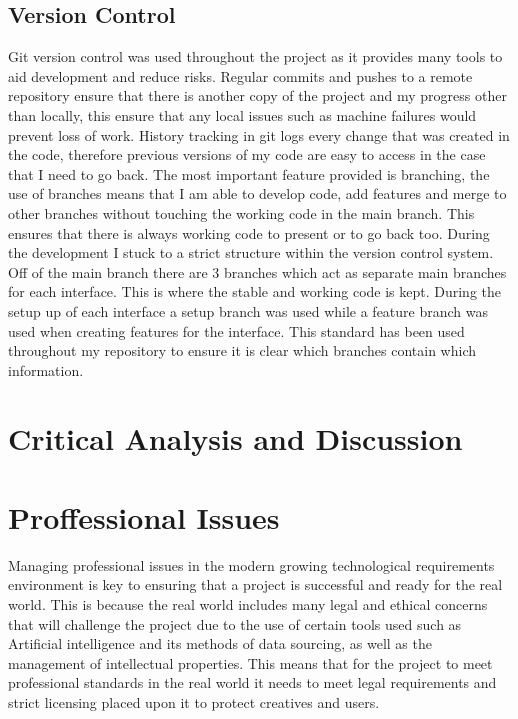 \documentclass[]{project_final}
\begin{document}
\section{Version Control}
Git version control was used throughout the project as it provides many tools to aid development and reduce risks. Regular commits and pushes to a remote repository ensure that
there is another copy of the project and my progress other than locally, this ensure that any
local issues such as machine failures would prevent loss of work.
History tracking in git logs every change that was created in the code, therefore previous
versions of my code are easy to access in the case that I need to go back.
The most important feature provided is branching, the use of branches means that I am able
to develop code, add features and merge to other branches without touching the working
code in the main branch. This ensures that there is always working code to present or to go
back too.
During the development I stuck to a strict structure within the version control system. Off of
the main branch there are 3 branches which act as separate main branches for each interface.
This is where the stable and working code is kept. During the setup up of each interface
a setup branch was used while a feature branch was used when creating features for the
interface. This standard has been used throughout my repository to ensure it is clear which
branches contain which information.


\chapter{Critical Analysis and Discussion}



\chapter{Proffessional Issues}

Managing professional issues in the modern growing technological requirements environment is key to ensuring that a project  is successful and ready for the real world. This is because the real world includes many legal and ethical concerns that will challenge the project due to the use of certain tools used such as Artificial intelligence and its methods of data sourcing, as well as the management of intellectual properties. This means that for the project to meet professional standards in the real world it needs to meet legal requirements and strict licensing placed upon it to protect creatives and users.
\end{document}
